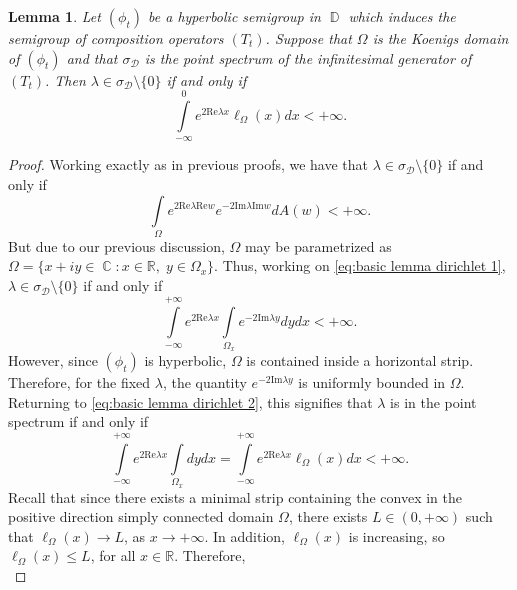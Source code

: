 \documentclass[11pt]{amsart}
\numberwithin{equation}{section}
\newtheorem{lemma}[theorem]{Lemma}
\theoremstyle{definition}
\DeclareMathOperator{\C}{\mathbb{C}}
\DeclareMathOperator{\D}{\mathbb{D}}
\begin{document}
	\begin{lemma}\label{lm:hyperbolic x parametrization}
		Let $(\phi_t)$ be a hyperbolic semigroup in $\D$ which induces the semigroup of composition operators $(T_t)$. Suppose that $\Omega$ is the Koenigs domain of $(\phi_t)$ and that $\sigma_\mathcal{D}$ is the point spectrum of the infinitesimal generator of $(T_t)$. Then $\lambda\in\sigma_{\mathcal{D}}\setminus\{0\}$ if and only if
		\begin{equation}
			\int\limits_{-\infty}^{0}e^{2\mathrm{Re}\lambda x}\ell_\Omega(x)dx<+\infty.
		\end{equation}
	\end{lemma}
	\begin{proof}
		Working exactly as in previous proofs, we have that $\lambda\in\sigma_\mathcal{D}\setminus\{0\}$ if and only if
		\begin{equation}\label{eq:basic lemma dirichlet 1}
			\int\limits_{\Omega}e^{2\mathrm{Re}\lambda\mathrm{Re}w}e^{-2\mathrm{Im}\lambda\mathrm{Im}w}dA(w)<+\infty.
		\end{equation}
		But due to our previous discussion, $\Omega$ may be parametrized as $\Omega=\{x+iy\in\C:x\in\mathbb{R}, \;y\in\Omega_x\}$. Thus, working on \eqref{eq:basic lemma dirichlet 1}, $\lambda\in\sigma_\mathcal{D}\setminus\{0\}$ if and only if
		\begin{equation}\label{eq:basic lemma dirichlet 2}
			\int\limits_{-\infty}^{+\infty}e^{2\mathrm{Re}\lambda x}\int\limits_{\Omega_x}e^{-2\mathrm{Im}\lambda y}dydx<+\infty.
		\end{equation}
		However, since $(\phi_t)$ is hyperbolic, $\Omega$ is contained inside a horizontal strip. Therefore, for the fixed $\lambda$, the quantity $e^{-2\mathrm{Im}\lambda y}$ is uniformly bounded in $\Omega$. Returning to \eqref{eq:basic lemma dirichlet 2}, this signifies that $\lambda$ is in the point spectrum if and only if
		\begin{equation}\label{eq:basic lemma dirichlet 3}
			\int\limits_{-\infty}^{+\infty}e^{2\mathrm{Re}\lambda x}\int\limits_{\Omega_x}dydx=\int\limits_{-\infty}^{+\infty}e^{2\mathrm{Re}\lambda x}\ell_\Omega(x)dx<+\infty.
		\end{equation}
		Recall that since there exists a minimal strip containing the convex in the positive direction simply connected domain $\Omega$, there exists $L\in(0,+\infty)$ such that $\ell_\Omega(x)\to L$, as $x\to+\infty$. In addition, $\ell_\Omega(x)$ is increasing, so $\ell_\Omega(x)\le L$, for all $x\in\mathbb{R}$. Therefore,
		\begin{equation}\label{eq:basic lemma dirichlet 4}

\end{equation}
\end{proof}
\end{document}
